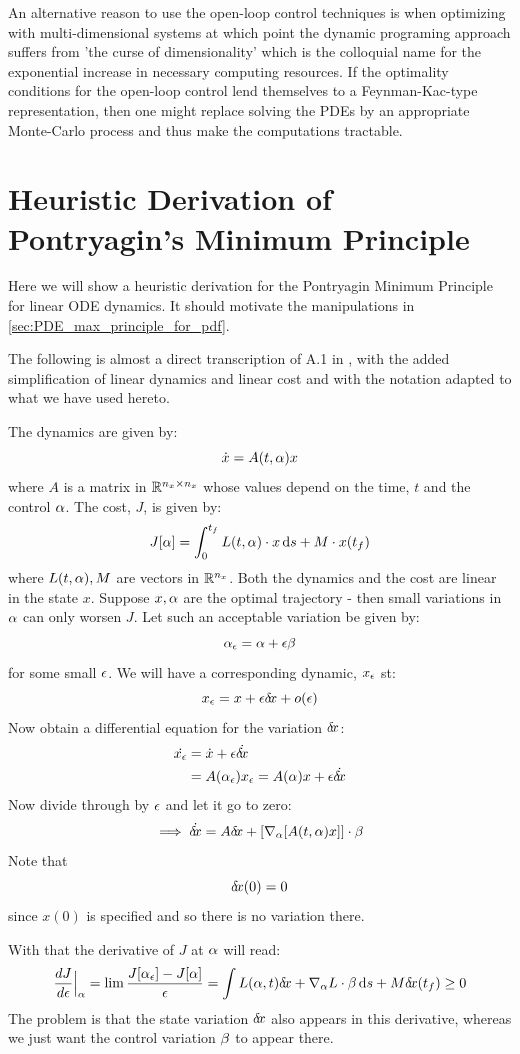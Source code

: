 \documentclass{article}
\begin{document}
An alternative reason to use the open-loop control techniques is when optimizing
with multi-dimensional systems at which point the dynamic programing approach
suffers from 'the curse of dimensionality' which is the colloquial name for the
exponential increase in necessary computing resources. If the optimality
conditions for the open-loop control lend themselves to a Feynman-Kac-type
representation, then one might replace solving the PDEs by an appropriate
Monte-Carlo process and thus make the computations tractable.
 
\clearpage
\appendix
\section{Heuristic Derivation of Pontryagin's Minimum Principle}
\label{sec:Pontryagin_heuristic_derivation}
Here we will show a heuristic derivation for the Pontryagin Minimum Principle
for linear ODE dynamics. It should motivate the manipulations in
\cref{sec:PDE_max_principle_for_pdf}.

The following is almost a direct transcription of A.1 in
\cite{Evansb}, with the added simplification of linear dynamics
and linear cost and with the notation adapted to what we have used
hereto.

The dynamics are given by:
$$
\dot{x} = A(t, {\alpha}) x
$$
where $A$ is a matrix in ${ \mathbb{R} }^{n_x \times n_x}$ whose values depend on the
time, $t$ and the control ${\alpha}$. The cost, $J$, is given by:
$$
J[{\alpha}] = \int_0^{ t_f } L(t,{\alpha}) \cdot x \, \mathrm{d} s + M \cdot x({ t_f })
$$
where $L(t,{\alpha}), M$
are vectors in ${ \mathbb{R} }^{n_x}$. Both the dynamics and the cost are linear in the state $x$.
Suppose $x,{\alpha}$ are the optimal trajectory - then small variations in ${\alpha}$ can
only worsen $J$. Let such an acceptable variation be given by:
$$
{\alpha}_{\epsilon} = {\alpha} + {\epsilon} {\beta}
$$
for some small ${\epsilon}$. We will have a corresponding dynamic, $x_{\epsilon}$ st:
$$
x_{\epsilon} = x + {\epsilon} { \delta\! x}+ o({\epsilon})
$$
Now obtain a differential equation for the variation ${ \delta\! x}$:
\begin{align*}
\dot{x_{\epsilon}} &=  \dot{x} + {\epsilon} \dot{{ \delta\! x}} 
\\
&= A({\alpha}_{\epsilon}) x_{\epsilon} = A({\alpha}) x + {\epsilon} \dot{{ \delta\! x}}
\end{align*}
Now divide through by ${\epsilon}$ and let it go to zero:
$$
\implies \dot{{ \delta\! x}} = A { \delta\! x} + [{ \nabla }_{\alpha} [ A(t,{\alpha})x]] \cdot{\beta}
$$
Note that $${ \delta\! x}(0) = 0$$ since $x(0)$ is specified and so there is no
variation there.

With that the derivative of $J$ at ${\alpha}$ will read:
\begin{multline}
\frac {dJ}{d{\epsilon}} \Big|_{{\alpha}} = \lim \frac{ J[{\alpha}_{\epsilon}] - J[{\alpha}]}{{\epsilon}} 
= \int L({\alpha},t) { \delta\! x} +  { \nabla }_{\alpha} L \cdot {\beta} \, \mathrm{d} s + M { \delta\! x}({ t_f })
\geq 0 
\label{eq:J_variation_ODE}
\end{multline}
The problem is that the state variation ${ \delta\! x}$ also appears in this derivative,
whereas we just want the control variation ${\beta}$ to appear there.
\end{document}
